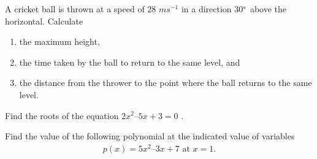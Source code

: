%
\item  A cricket ball is thrown at a speed of 28 $m s^{-1}$
in a direction 30$\degree$ above
the horizontal. Calculate 
\begin{enumerate}
\item  the maximum height, 
\item  the time taken by the ball to return to the same level, and 
\item  the distance from the thrower to the point where the ball returns to the same level.
\end{enumerate}
\item Find the roots of the equation  $2x^2– 5x + 3 = 0$ .
\item Find the value of  the following polynomial at the indicated value of variables 
\begin{align}
p(x) = 5x^2– 3x + 7 \text{  at } x = 1.
\end{align}
